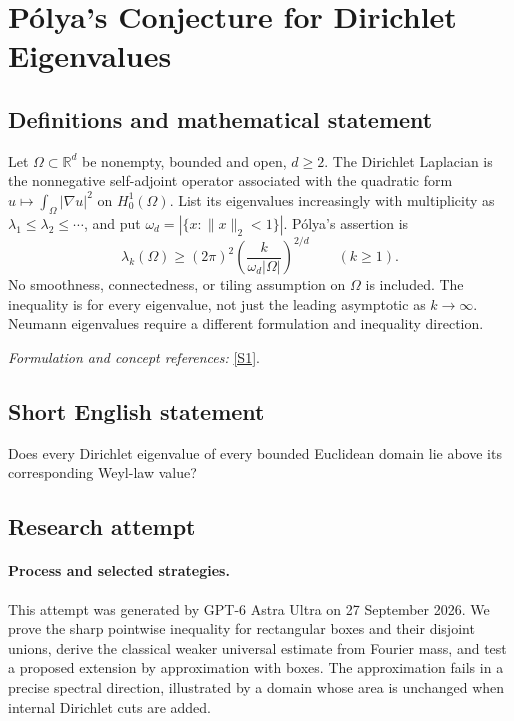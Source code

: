 \documentclass[11pt]{article}
\begin{document}
\section*{\texorpdfstring{Pólya's Conjecture for Dirichlet Eigenvalues}{Pólya's Conjecture for Dirichlet Eigenvalues}}\label{402}
\subsection{Definitions and mathematical statement}
Let $\Omega\subset{\mathbb{R}}^d$ be nonempty, bounded and open, $d\ge2$. The Dirichlet Laplacian is the nonnegative self-adjoint operator associated with the quadratic form $u\mapsto\int_\Omega|\nabla u|^2$ on $H_0^1(\Omega)$. List its eigenvalues increasingly with multiplicity as $\lambda_1\le\lambda_2\le\cdots$, and put $\omega_d=|\{x:\|x\|_2<1\}|$. P\'olya's assertion is
\[
 \lambda_k(\Omega)\ge(2\pi)^2
 \left(\frac{k}{\omega_d|\Omega|}\right)^{2/d}
 \qquad(k\ge1).
\]
No smoothness, connectedness, or tiling assumption on $\Omega$ is included. The inequality is for every eigenvalue, not just the leading asymptotic as $k\to\infty$. Neumann eigenvalues require a different formulation and inequality direction.
\par\smallskip\textit{Formulation and concept references:} \href{https://link.springer.com/article/10.1007/s00222-023-01198-1}{[S1]}.

\subsection{Short English statement}
Does every Dirichlet eigenvalue of every bounded Euclidean domain lie above its corresponding Weyl-law value?
\subsection{Research attempt}
\paragraph{Process and selected strategies.}
This attempt was generated by GPT-6 Astra Ultra on 27 September 2026. We prove the sharp pointwise inequality for rectangular boxes and their disjoint unions, derive the classical weaker universal estimate from Fourier mass, and test a proposed extension by approximation with boxes. The approximation fails in a precise spectral direction, illustrated by a domain whose area is unchanged when internal Dirichlet cuts are added.
\end{document}
